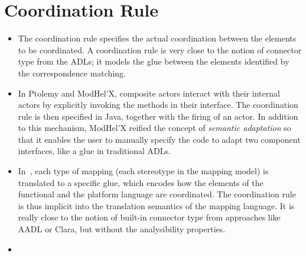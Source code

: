 \section{Coordination Rule}
		\begin{itemize}
			\item The coordination rule specifies the actual coordination between the elements to be coordinated. A coordination rule is very close to the notion of connector type from the ADLs; it models the glue between the elements identified by the correspondence matching.
			
			\item In Ptolemy and ModHel'X, composite actors interact with their internal actors by explicitly invoking the methods in their interface. The coordination rule is then specified in Java, together with the firing of an actor. In addition to this mechanism, ModHel'X reified the concept of \emph{semantic adaptation} so that it enables the user to manually specify the code to adapt two component interfaces, like a glue in traditional ADLs.
			
			\item In~\cite{dinatale}, each type of mapping (\ie each stereotype in the mapping model) is translated to a specific glue, which encodes how the elements of the functional and the platform language are coordinated. The coordination rule is thus implicit into the translation semantics of the mapping language. It is really close to the notion of built-in connector type from approaches like AADL or Clara, but without the analysibility properties.        
			
			\item {}  
		\end{itemize}
		
